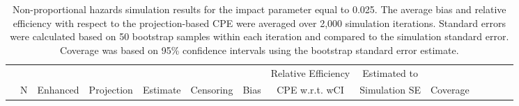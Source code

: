 \documentclass[12pt]{article}
\begin{document}
 
 
 \begin{table}[ht]
 \caption{Non-proportional hazards simulation results for the impact parameter equal to 0.025.
  The average bias and relative efficiency with respect to the projection-based CPE were averaged over 2,000 simulation iterations. Standard errors were calculated based on 50 bootstrap samples within each iteration and compared to the simulation standard error. Coverage was based on 95\% confidence intervals using the bootstrap standard error estimate. }
\centering
\tiny
\begin{tabular}{lccccccccccccc} \label{NPHsimresultsDelta0025}
\vspace{-0.25cm}
   &&&&&& & Relative Efficiency   & Estimated to  &\\
& N & Enhanced &  Projection & Estimate & Censoring &Bias & CPE w.r.t. wCI & Simulation SE & Coverage \\


\end{tabular}
\end{table}
\end{document}
